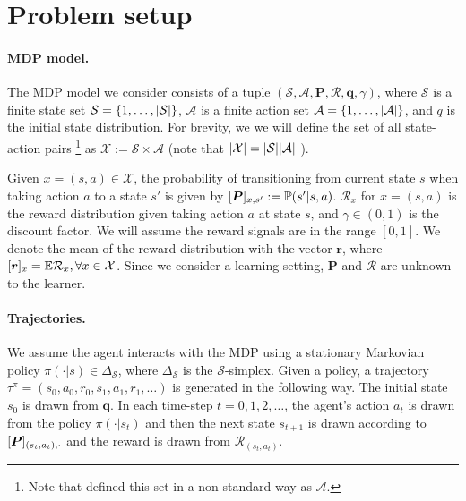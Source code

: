 \documentclass{article}
\newcommand{\ra}[1]{\textcolor{blue}{\{Ron: #1\}}}
\DeclarePairedDelimiter\brs{[}{]}%
\DeclarePairedDelimiter\brc{\{}{\}}%
\DeclarePairedDelimiter\abs{\lvert}{\rvert}%
\newcommand{\Prob}{\mathbb{P}}
\newcommand{\E}{\mathbb{E}}
\newcommand{\States}{\mathcal{S}}
\newcommand{\Actions}{\mathcal{A}}
\newcommand{\nSt}{{\abs{\States}}}
\newcommand{\nAct}{{\abs{\Actions}}}
\newcommand{\Pairs}{\mathcal{X}}
\newcommand{\nPairs}{{\abs{\mathcal{X}}}}
\newcommand{\Pb}{\boldsymbol{P}}
\newcommand{\rb}{\boldsymbol{r}}
\newcommand{\Rc}{\mathcal{R}}
\newcommand{\initDist}{\boldsymbol{q}}
\begin{document}
\section{Problem setup} \label{sect:setup}

\paragraph{MDP model.}
The MDP model we consider consists of a tuple $(\States, \Actions, \Pb, \Rc, \initDist, \gamma)$, where $\States$ is a finite state set $\States=\brc{1,\dots,\nSt}$,  $\Actions$ is a finite action set $\Actions=\brc{1,\dots,\nAct}$,  and 
$q$ is the initial state distribution.
For brevity, we we will define the set of all state-action pairs
\footnote{Note that \citet{jin20efficiently} defined this set in a non-standard way as $\Actions$.}
as $\Pairs := \States \times \Actions$ (note that $\nPairs = \nSt \nAct$ ).

Given $x=(s,a) \in \Pairs$, the probability of transitioning from  current state $s$ when taking action $a$ to a state $s'$ is given by
 $\brs{\Pb}_{x, s'}:=\Prob(s'|s,a)$.
$\Rc_{x}$ for $x=(s,a)$ is the reward distribution given taking action $a$ at state $s$, and $\gamma \in (0,1)$ is the discount factor.
We will assume the reward signals are in the range $[0,1]$.
We denote the mean of the reward distribution with the vector $\rb$, where  $\brs{\rb}_{x} = \E \Rc_{x} , \forall x \in \Pairs$.
Since we consider a learning setting, $\Pb$ and $\Rc$ are unknown to the learner.

\paragraph{Trajectories.}
We assume the agent interacts with the MDP using a stationary Markovian policy $\pi(\cdot|s) \in \Delta_\States$, where $\Delta_\States$ is the $\States$-simplex.
Given a policy, a trajectory $\tau^{\pi} = (s_0, a_0,r_0, s_1, a_1, r_1, \dots)$ is generated in the following way.
The initial state $s_0$ is drawn from $\initDist$.
In each time-step $t=0,1,2,\dots$, the agent's action $a_t$ is drawn from the policy $\pi(\cdot|s_t)$ and then the next state $s_{t+1}$ is drawn according to 
$\brs{\Pb}_{(s_t,a_t),\cdot}$ and the reward is drawn from $\Rc_{(s_t,a_t)}$.
\end{document}
